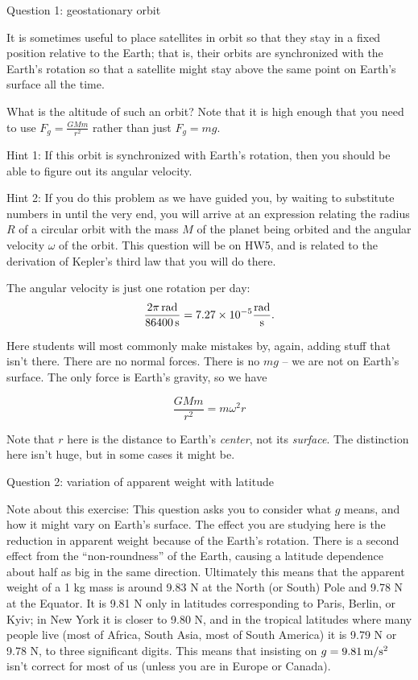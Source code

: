 \documentclass[12pt]{article}
\begin{document}
\Large
\centerline{}
\normalsize
\centerline{}

\medskip


\centerline{\Large Question 1: geostationary orbit}

It is sometimes useful to place satellites in orbit so that they stay in a fixed position relative to the
Earth; that is, their orbits are synchronized with the Earth's rotation so that a satellite might stay
above the same point on Earth’s surface all the time.

What is the altitude of such an orbit? Note that it is high enough that you need to use $F_g=\frac{GMm}{r^2}$
rather than just $F_g = mg$.

{\sc Hint 1:} If this orbit is synchronized with Earth's rotation, then you should be able to figure out its
angular velocity.




{\sc Hint 2:} If you do this problem as we have guided you, by waiting to substitute numbers in until the 
very end, you will arrive at an expression relating the radius $R$ of a circular orbit with the mass $M$ of the 
planet being orbited and the angular velocity $\omega$ of the orbit. This question will be on HW5, and is related
to the derivation of Kepler's third law that you will do there.

{\color{Red}
	The angular velocity is just one rotation per day: $$\frac {2\pi\,\text{rad}}{86400\,\rm s} = 7.27 \times 10^{-5} \frac{\text{rad}}{\rm s}.$$

Here students will most commonly make mistakes by, again, adding stuff that isn't there. There are no normal forces. There is no $mg$ -- we are not on Earth's surface. The only force is Earth's gravity, so we have 

$$
\frac{GMm}{r^2} = m \omega^2 r
$$

Note that $r$ here is the distance to Earth's {\it center}, not its {\it surface}. The distinction here isn't huge, but in some cases it might be.
	
}


\newpage

\centerline{\Large Question 2: variation of apparent weight with latitude}

\medskip

{\footnotesize Note about this exercise: This question asks you to consider what $g$ means, and how it might vary on Earth's surface. The effect you are studying here is the reduction in apparent weight because of the Earth's rotation. There is a second effect from the ``non-roundness'' of the Earth, causing a latitude dependence about half as big in the same direction. Ultimately this means that the apparent weight of a 1 kg mass is around 9.83 N at the North (or South) Pole and 9.78 N at the Equator. It is 9.81 N only in latitudes corresponding to Paris, Berlin, or Kyiv; in New York it is closer to 9.80 N, and in the tropical latitudes where many people live (most of Africa, South Asia, most of South America) it is 9.79 N or 9.78 N, to three significant digits. This means that insisting on $g=9.81\,\rm m/\rm s^2$ isn't correct for most of us (unless you are in Europe or Canada).
}
\end{document}
